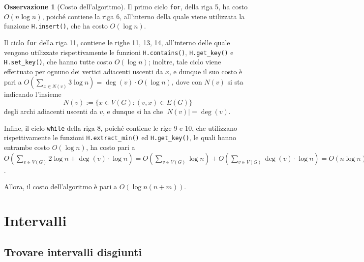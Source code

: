 \documentclass[14pt]{extreport}
\theoremstyle{definition}
\theoremstyle{definition}
\newtheorem{remark}{Osservazione}[subsection]
\begin{document}
\begin{remark}[Costo dell'algoritmo]
    Il primo ciclo \texttt{for}, della riga 5, ha costo $O(n \log n)$, poiché contiene la riga 6, all'interno della quale viene utilizzata la funzione \texttt{H.insert()}, che ha costo $O(\log n)$.

    Il ciclo \texttt{for} della riga 11, contiene le righe 11, 13, 14, all'interno delle quale vengono utilizzate rispettivamente le funzioni \texttt{H.contains()}, \texttt{H.get\_key()} e \texttt{H.set\_key()}, che hanno tutte costo $O(\log n)$; inoltre, tale ciclo viene effettuato per ognuno dei vertici adiacenti uscenti da $x$, e dunque il suo costo è pari a $\displaystyle O \left( \sum_{x \in N(v)} 3 \log n \right) = \deg(v) \cdot O(\log n)$, dove con $N(v)$ si sta indicando l'insieme $$N (v) := \{x \in V(G) : (v, x) \in E(G)\}$$ degli archi adiacenti uscenti da $v$, e dunque si ha che $\left|N(v)\right| = \deg(v)$.

    Infine, il ciclo \texttt{while} della riga 8, poiché contiene le rige 9 e 10, che utilizzano rispettivamente le funzioni \texttt{H.extract\_min()} ed \texttt{H.get\_key()}, le quali hanno entrambe costo $O(\log n)$, ha costo pari a $\displaystyle O \left( \sum_{v \in V(G)} 2 \log n + \deg(v) \cdot \log n \right) = O \left( \sum_{v \in V(G)} \log n \right) + O \left ( \sum_{v \in V(G)} \deg(v) \cdot \log n \right) = O(n \log n) + \log n \cdot O (m )$.

    Allora, il costo dell'algoritmo è pari a $O (\log n (n + m))$.
\end{remark}

\section{Intervalli}

\subsection{Trovare intervalli disgiunti}
\end{document}
